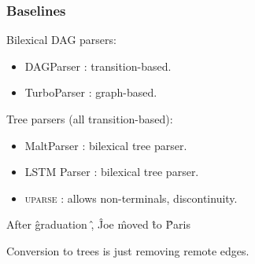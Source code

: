 \documentclass[t]{beamer}
\begin{document}
\begin{frame}
\frametitle{Baselines}
Bilexical DAG parsers:
\begin{itemize}
 \item DAGParser \cite{ribeyre-villemontedelaclergerie-seddah:2014:SemEval}:
 transition-based.
 \item TurboParser \cite{almeida-martins:2015:SemEval}:
 graph-based.
\end{itemize}

Tree parsers (all transition-based):
\begin{itemize}
 \item MaltParser \cite{nivre2007maltparser}: bilexical tree parser.
 \item LSTM Parser \cite{dyer2015transition}: bilexical tree parser.
 \item \textsc{uparse} \cite{maier2015discontinuous}: allows non-terminals, discontinuity.
\end{itemize}

\begin{center}
	\begin{dependency}
	\begin{deptext}[column sep=.7em,ampersand replacement=\^,font=\rmfamily]
	After \^ graduation \^ , \^ Joe \^ moved \^ to \^ Paris \\
	\end{deptext}
	\end{dependency}
\end{center}

\vfill
Conversion to trees is just removing remote edges.
\end{frame}
\end{document}

